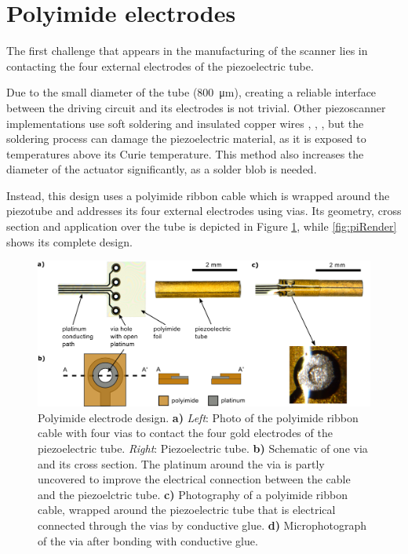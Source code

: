 \section{Polyimide electrodes}
The first challenge that appears in the manufacturing of the scanner lies in contacting the four external electrodes of the piezoelectric tube. 

Due to the small diameter of the tube (\SI{800}{\micro\meter}), creating a reliable interface between the driving circuit and its electrodes is not trivial. Other piezoscanner implementations use soft soldering and insulated copper wires \cite{Lee2010}, \cite{Meinert}, \cite{Huo2010}, but the soldering process can damage the piezoelectric material, as it is exposed to temperatures above its Curie temperature. This method also increases the diameter of the actuator significantly, as a solder blob is needed. %

Instead, this design uses a polyimide ribbon cable which is wrapped around the piezotube and addresses its four external electrodes using vias. Its geometry, cross section and application over the tube is depicted in Figure \ref{fig:piRolled}, while \autoref{fig:piRender} shows its complete design.

\begin{figure}[h!]\centering \includegraphics[width=15cm]{figures/40_Fabrication/PI/tubeFoilH.png}
      \caption{Polyimide electrode design.
      \textbf{a)} \textit{Left}: Photo of the polyimide ribbon cable with four vias to contact the four gold electrodes of the piezoelectric tube. \textit{Right}: Piezoelectric tube.
      \textbf{b)} Schematic of one via and its cross section. The platinum around the via is partly uncovered to improve the electrical connection between the cable and the piezoelctric tube.
      \textbf{c)} Photography of a polyimide ribbon cable, wrapped around the piezoelectric tube that is electrical connected through the vias by conductive glue.
      \textbf{d)} Microphotograph of the via after bonding with conductive glue.}
      \label{fig:piRolled}
\end{figure}

